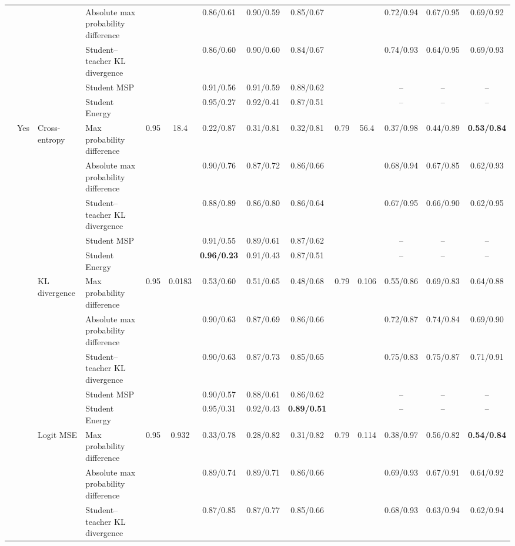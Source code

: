 \documentclass[border=2pt]{standalone}
\begin{document}
\begin{tabular}{llllcccccccccc}
 &  &  & Absolute max probability difference &  &  & 0.86/0.61 & 0.90/0.59 & 0.85/0.67 &  &  & 0.72/0.94 & 0.67/0.95 & 0.69/0.92 \\
 &  &  & Student--teacher KL divergence &  &  & 0.86/0.60 & 0.90/0.60 & 0.84/0.67 &  &  & 0.74/0.93 & 0.64/0.95 & 0.69/0.93 \\
 &  &  & Student MSP &  &  & 0.91/0.56 & 0.91/0.59 & 0.88/0.62 &  &  & -- & -- & -- \\
 &  &  & Student Energy &  &  & 0.95/0.27 & 0.92/0.41 & 0.87/0.51 &  &  & -- & -- & -- \\
 & Yes & Cross-entropy & Max probability difference & 0.95 & 18.4 & 0.22/0.87 & 0.31/0.81 & 0.32/0.81 & 0.79 & 56.4 & 0.37/0.98 & 0.44/0.89 & \textbf{0.53/0.84} \\
 &  &  & Absolute max probability difference &  &  & 0.90/0.76 & 0.87/0.72 & 0.86/0.66 &  &  & 0.68/0.94 & 0.67/0.85 & 0.62/0.93 \\
 &  &  & Student--teacher KL divergence &  &  & 0.88/0.89 & 0.86/0.80 & 0.86/0.64 &  &  & 0.67/0.95 & 0.66/0.90 & 0.62/0.95 \\
 &  &  & Student MSP &  &  & 0.91/0.55 & 0.89/0.61 & 0.87/0.62 &  &  & -- & -- & -- \\
 &  &  & Student Energy &  &  & \textbf{0.96/0.23} & 0.91/0.43 & 0.87/0.51 &  &  & -- & -- & -- \\
 &  & KL divergence & Max probability difference & 0.95 & 0.0183 & 0.53/0.60 & 0.51/0.65 & 0.48/0.68 & 0.79 & 0.106 & 0.55/0.86 & 0.69/0.83 & 0.64/0.88 \\
 &  &  & Absolute max probability difference &  &  & 0.90/0.63 & 0.87/0.69 & 0.86/0.66 &  &  & 0.72/0.87 & 0.74/0.84 & 0.69/0.90 \\
 &  &  & Student--teacher KL divergence &  &  & 0.90/0.63 & 0.87/0.73 & 0.85/0.65 &  &  & 0.75/0.83 & 0.75/0.87 & 0.71/0.91 \\
 &  &  & Student MSP &  &  & 0.90/0.57 & 0.88/0.61 & 0.86/0.62 &  &  & -- & -- & -- \\
 &  &  & Student Energy &  &  & 0.95/0.31 & 0.92/0.43 & \textbf{0.89/0.51} &  &  & -- & -- & -- \\
 &  & Logit MSE & Max probability difference & 0.95 & 0.932 & 0.33/0.78 & 0.28/0.82 & 0.31/0.82 & 0.79 & 0.114 & 0.38/0.97 & 0.56/0.82 & \textbf{0.54/0.84} \\
 &  &  & Absolute max probability difference &  &  & 0.89/0.74 & 0.89/0.71 & 0.86/0.66 &  &  & 0.69/0.93 & 0.67/0.91 & 0.64/0.92 \\
 &  &  & Student--teacher KL divergence &  &  & 0.87/0.85 & 0.87/0.77 & 0.85/0.66 &  &  & 0.68/0.93 & 0.63/0.94 & 0.62/0.94 \\

\end{tabular}
\end{document}
